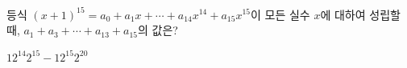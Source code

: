 등식 $(x+1)^{15}=a_0+a_1x+\cdots+a_{14}x^{14}+a_{15}x^{15}$이 모든 실수 $x$에 대하여 성립할 때, $a_1+a_3+\cdots+a_{13}+a_{15}$의 값은? 
\begin{choices32}{$1$}{$2^{14}$}{$2^{15}-1$}{$2^{15}$}{$2^{20}$}\end{choices32}
